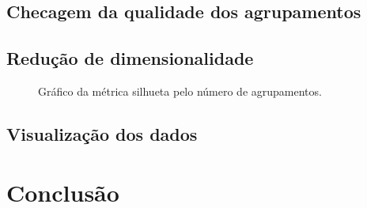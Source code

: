 \documentclass[conference]{IEEEtran}
\begin{document}
\subsection{Checagem da qualidade dos agrupamentos}




\subsection{Redução de dimensionalidade}

\begin{figure}[!h]
	\centering
	{
	}
	\caption{\small Gráfico da métrica silhueta pelo número de agrupamentos.}
	\label{fig:silhueta}
\end{figure}


\subsection{Visualização dos dados}

\section{Conclusão}
\end{document}
